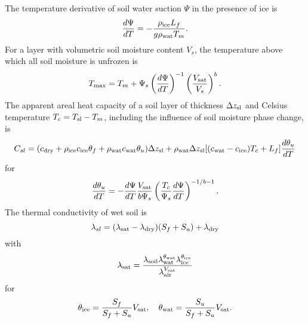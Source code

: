 \documentclass[fleqn]{article}
\begin{document}
The temperature derivative of soil water suction $\Psi$ in the presence of ice is
\begin{equation}
\frac{d\Psi}{dT} = - \frac{\rho_{\rm ice}L_f}{g\rho_{\rm wat}T_m}.
\end{equation}
For a layer with volumetric soil moisture content $V_s$, the temperature above which all soil moisture is unfrozen is 
\begin{equation}
T_{\rm max} = T_m + \Psi_s\left(\frac{d\Psi}{dT}\right)^{-1}\left(\frac{V_{\rm sat}}{V_s}\right)^b.
\end{equation}
The apparent areal heat capacity of a soil layer of thickness $\Delta z_{\rm sl}$ and Celsius temperature $T_c = T_{\rm sl} - T_m$, including the influence of soil moisture phase change, is
\begin{equation}
C_{sl} = (c_{\rm dry} + \rho_{\rm ice}c_{\rm ice}\theta_f + \rho_{\rm wat}c_{\rm wat}\theta_u)\Delta z_{\rm sl} +      
               \rho_{\rm wat}\Delta z_{\rm sl}[(c_{\rm wat} - c_{\rm ice})T_c + L_f]\frac{d\theta_u}{dT}
\end{equation}
for
\begin{equation}
\frac{d\theta_u}{dT} = - \frac{d\Psi}{dT}\frac{V_{\rm sat}}{b\Psi_s}
                         \left(\frac{T_c}{\Psi_s}\frac{d\Psi}{dT}\right)^{-1/b-1}.
\end{equation}
The thermal conductivity of wet soil is
\begin{equation}
\lambda_{sl} = (\lambda_{\rm sat} - \lambda_{\rm dry})(S_f + S_u) + \lambda_{\rm dry}
\end{equation}
with
\begin{equation}
\lambda_{\rm sat} = \frac{\lambda_{\rm soil}\lambda_{\rm wat}^{\theta_{\rm wat}}\lambda_{\rm ice}^{\theta_{\rm ice}}}        
                         {\lambda_{\rm air}^{V_{\rm sat}}}
\end{equation}
for
\begin{equation}
\theta_{\rm ice} = \frac{S_f}{S_f + S_u}V_{\rm sat},\quad
\theta_{\rm wat} = \frac{S_u}{S_f + S_u}V_{\rm sat}.
\end{equation}
\end{document}
